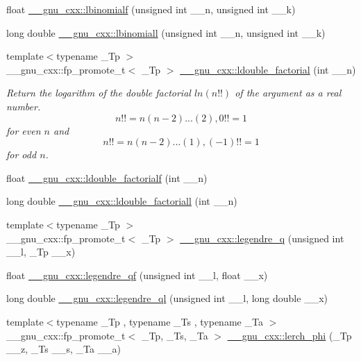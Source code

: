 \begin{DoxyCompactItemize}
float \hyperlink{group__gnu__math__spec__func_ga2fe55bab4211fb240e1eb01341914129}{\+\_\+\+\_\+gnu\+\_\+cxx\+::lbinomialf} (unsigned int \+\_\+\+\_\+n, unsigned int \+\_\+\+\_\+k)
\item 
long double \hyperlink{group__gnu__math__spec__func_ga20e6c250e10e20b9e2c3f68bf9a3d4c1}{\+\_\+\+\_\+gnu\+\_\+cxx\+::lbinomiall} (unsigned int \+\_\+\+\_\+n, unsigned int \+\_\+\+\_\+k)
\item 
{\footnotesize template$<$typename \+\_\+\+Tp $>$ }\\\+\_\+\+\_\+gnu\+\_\+cxx\+::fp\+\_\+promote\+\_\+t$<$ \+\_\+\+Tp $>$ \hyperlink{group__gnu__math__spec__func_ga43bf9a20282d5b9237bf352682a48395}{\+\_\+\+\_\+gnu\+\_\+cxx\+::ldouble\+\_\+factorial} (int \+\_\+\+\_\+n)
\begin{DoxyCompactList}\small\item\em Return the logarithm of the double factorial $ ln(n!!) $ of the argument as a real number. \[ n!! = n(n-2)...(2), 0!! = 1 \] for even $ n $ and \[ n!! = n(n-2)...(1), (-1)!! = 1 \] for odd $ n $. \end{DoxyCompactList}\item 
float \hyperlink{group__gnu__math__spec__func_ga33ecc59a7ff139b483cebf42ecd4fe79}{\+\_\+\+\_\+gnu\+\_\+cxx\+::ldouble\+\_\+factorialf} (int \+\_\+\+\_\+n)
\item 
long double \hyperlink{group__gnu__math__spec__func_gae8fa4b4866cfd20349c985b33ed2936e}{\+\_\+\+\_\+gnu\+\_\+cxx\+::ldouble\+\_\+factoriall} (int \+\_\+\+\_\+n)
\item 
{\footnotesize template$<$typename \+\_\+\+Tp $>$ }\\\+\_\+\+\_\+gnu\+\_\+cxx\+::fp\+\_\+promote\+\_\+t$<$ \+\_\+\+Tp $>$ \hyperlink{group__gnu__math__spec__func_gadad5b22d0075dca31690907668af568f}{\+\_\+\+\_\+gnu\+\_\+cxx\+::legendre\+\_\+q} (unsigned int \+\_\+\+\_\+l, \+\_\+\+Tp \+\_\+\+\_\+x)
\item 
float \hyperlink{group__gnu__math__spec__func_ga46cf4d58886af402c6776bc090b4e4a7}{\+\_\+\+\_\+gnu\+\_\+cxx\+::legendre\+\_\+qf} (unsigned int \+\_\+\+\_\+l, float \+\_\+\+\_\+x)
\item 
long double \hyperlink{group__gnu__math__spec__func_ga60feac5a8bd733abee6610adf15208f2}{\+\_\+\+\_\+gnu\+\_\+cxx\+::legendre\+\_\+ql} (unsigned int \+\_\+\+\_\+l, long double \+\_\+\+\_\+x)
\item 
{\footnotesize template$<$typename \+\_\+\+Tp , typename \+\_\+\+Ts , typename \+\_\+\+Ta $>$ }\\\+\_\+\+\_\+gnu\+\_\+cxx\+::fp\+\_\+promote\+\_\+t$<$ \+\_\+\+Tp, \+\_\+\+Ts, \+\_\+\+Ta $>$ \hyperlink{group__gnu__math__spec__func_ga31d7cfc601a99d72e58f654d0c890fd6}{\+\_\+\+\_\+gnu\+\_\+cxx\+::lerch\+\_\+phi} (\+\_\+\+Tp \+\_\+\+\_\+z, \+\_\+\+Ts \+\_\+\+\_\+s, \+\_\+\+Ta \+\_\+\+\_\+a)

\end{DoxyCompactItemize}
